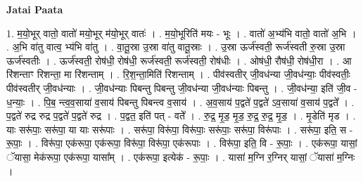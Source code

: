 \documentclass[17pt]{extarticle}
\begin{document}
\textbf{Jatai Paata} \newline

1. म॒यो॒भूर् वातो॒ वातो॑ मयो॒भूर् म॑यो॒भूर् वातः॑ । . म॒यो॒भूरिति॑ मयः - भूः । . वातो॑ अ॒भ्य॑भि वातो॒ वातो॑ अ॒भि । . अ॒भि वा॑तु वात्व॒ भ्य॑भि वा॑तु । . वा॒तू॒स्रा उ॒स्रा वा॑तु वातू॒स्राः । . उ॒स्रा ऊर्ज॑स्वती॒ रूर्ज॑स्वती रु॒स्रा उ॒स्रा ऊर्ज॑स्वतीः । . ऊर्ज॑स्वती॒ रोष॑धी॒ रोष॑धी॒ रूर्ज॑स्वती॒ रूर्ज॑स्वती॒ रोष॑धीः । . ओष॑धी॒ रौष॑धी॒ रोष॑धी॒रा । . आ रि॑शन्ताꣳ रिशन्ता॒ मा रि॑शन्ताम् । . रि॒श॒न्ता॒मिति॑ रिशन्ताम् । . पीव॑स्वतीर् जी॒वध॑न्या जी॒वध॑न्याः॒ पीव॑स्वतीः॒ पीव॑स्वतीर् जी॒वध॑न्याः । . जी॒वध॑न्याः पिबन्तु पिबन्तु जी॒वध॑न्या जी॒वध॑न्याः पिबन्तु । . जी॒वध॑न्या॒ इति॑ जी॒व - ध॒न्याः॒ । . पि॒ब॒ न्त्व॒व॒साया॑ व॒साय॑ पिबन्तु पिबन्त्व व॒साय॑ । . अ॒व॒साय॑ प॒द्वते॑ प॒द्वते॑ ऽव॒साया॑ व॒साय॑ प॒द्वते᳚ । . प॒द्वते॑ रुद्र रुद्र प॒द्वते॑ प॒द्वते॑ रुद्र । . प॒द्वत॒ इति॑ पत् - वते᳚ । . रु॒द्र॒ मृ॒ड॒ मृ॒ड॒ रु॒द्र॒ रु॒द्र॒ मृ॒ड॒ । . मृ॒डेति॑ मृड । . याः सरू॑पाः॒ सरू॑पा॒ या याः सरू॑पाः । . सरू॑पा॒ विरू॑पा॒ विरू॑पाः॒ सरू॑पाः॒ सरू॑पा॒ विरू॑पाः । . सरू॑पा॒ इति॒ स - रू॒पाः॒ । . विरू॑पा॒ एक॑रूपा॒ एक॑रूपा॒ विरू॑पा॒ विरू॑पा॒ एक॑रूपाः । . विरू॑पा॒ इति॒ वि - रू॒पाः॒ । . एक॑रूपा॒ यासां॒ ॅयासा॒ मेक॑रूपा॒ एक॑रूपा॒ यासा᳚म् । . एक॑रूपा॒ इत्येक॑ - रू॒पाः॒ । . यासा॑ म॒ग्नि र॒ग्निर् यासां॒ ॅयासा॑ म॒ग्निः । \newline
\end{document}
